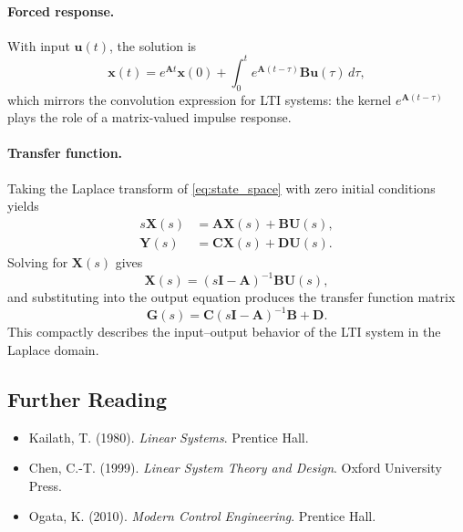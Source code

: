 \paragraph{Forced response.}
With input \(\mathbf{u}(t)\), the solution is
\begin{equation}
    \mathbf{x}(t) = e^{\mathbf{A}t} \mathbf{x}(0) + \int_0^t e^{\mathbf{A}(t-\tau)} \mathbf{B} \mathbf{u}(\tau) \, d\tau, \label{eq:state_solution}
\end{equation}
which mirrors the convolution expression for LTI systems: the kernel \(e^{\mathbf{A}(t-\tau)}\) plays the role of a matrix-valued impulse response.

\paragraph{Transfer function.}
Taking the Laplace transform of \eqref{eq:state_space} with zero initial conditions yields
\begin{align*}
    s \mathbf{X}(s) &= \mathbf{A} \mathbf{X}(s) + \mathbf{B} \mathbf{U}(s), \\
    \mathbf{Y}(s) &= \mathbf{C} \mathbf{X}(s) + \mathbf{D} \mathbf{U}(s).
\end{align*}
Solving for \(\mathbf{X}(s)\) gives
\[
    \mathbf{X}(s) = (s \mathbf{I} - \mathbf{A})^{-1} \mathbf{B} \mathbf{U}(s),
\]
and substituting into the output equation produces the transfer function matrix
\begin{equation}
    \mathbf{G}(s) = \mathbf{C} (s \mathbf{I} - \mathbf{A})^{-1} \mathbf{B} + \mathbf{D}. \label{eq:transfer_function}
\end{equation}
This compactly describes the input--output behavior of the LTI system in the Laplace domain.

\subsection*{Further Reading}

\begin{itemize}
    \item Kailath, T. (1980). \emph{Linear Systems}. Prentice Hall.
    \item Chen, C.-T. (1999). \emph{Linear System Theory and Design}. Oxford University Press.
    \item Ogata, K. (2010). \emph{Modern Control Engineering}. Prentice Hall.
\end{itemize}
\nocite{Kailath1980, Chen1999LinearSystemTheoryDesign, Ogata2010}
